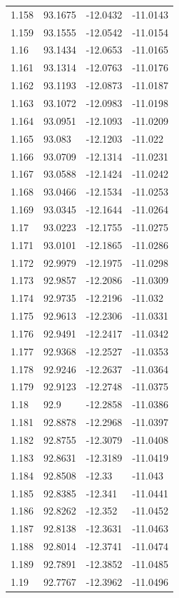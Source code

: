 \begin{tabular}{llll}
1.158 & 93.1675 & -12.0432 & -11.0143 \\
1.159 & 93.1555 & -12.0542 & -11.0154 \\
1.16 & 93.1434 & -12.0653 & -11.0165 \\
1.161 & 93.1314 & -12.0763 & -11.0176 \\
1.162 & 93.1193 & -12.0873 & -11.0187 \\
1.163 & 93.1072 & -12.0983 & -11.0198 \\
1.164 & 93.0951 & -12.1093 & -11.0209 \\
1.165 & 93.083 & -12.1203 & -11.022 \\
1.166 & 93.0709 & -12.1314 & -11.0231 \\
1.167 & 93.0588 & -12.1424 & -11.0242 \\
1.168 & 93.0466 & -12.1534 & -11.0253 \\
1.169 & 93.0345 & -12.1644 & -11.0264 \\
1.17 & 93.0223 & -12.1755 & -11.0275 \\
1.171 & 93.0101 & -12.1865 & -11.0286 \\
1.172 & 92.9979 & -12.1975 & -11.0298 \\
1.173 & 92.9857 & -12.2086 & -11.0309 \\
1.174 & 92.9735 & -12.2196 & -11.032 \\
1.175 & 92.9613 & -12.2306 & -11.0331 \\
1.176 & 92.9491 & -12.2417 & -11.0342 \\
1.177 & 92.9368 & -12.2527 & -11.0353 \\
1.178 & 92.9246 & -12.2637 & -11.0364 \\
1.179 & 92.9123 & -12.2748 & -11.0375 \\
1.18 & 92.9 & -12.2858 & -11.0386 \\
1.181 & 92.8878 & -12.2968 & -11.0397 \\
1.182 & 92.8755 & -12.3079 & -11.0408 \\
1.183 & 92.8631 & -12.3189 & -11.0419 \\
1.184 & 92.8508 & -12.33 & -11.043 \\
1.185 & 92.8385 & -12.341 & -11.0441 \\
1.186 & 92.8262 & -12.352 & -11.0452 \\
1.187 & 92.8138 & -12.3631 & -11.0463 \\
1.188 & 92.8014 & -12.3741 & -11.0474 \\
1.189 & 92.7891 & -12.3852 & -11.0485 \\
1.19 & 92.7767 & -12.3962 & -11.0496 \\

\end{tabular}
